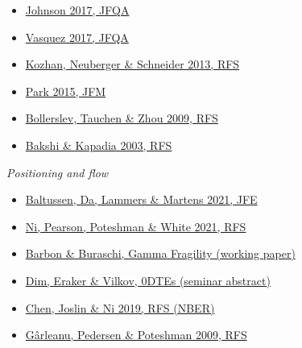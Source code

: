 \documentclass{article}
\begin{document}
\begin{itemize}

\item \href{https://ideas.repec.org/a/cup/jfinqa/v52y2017i06p2461-2490_00.html}{Johnson 2017, JFQA}

\item \href{https://ideas.repec.org/a/cup/jfinqa/v52y2017i06p2727-2754_00.html}{Vasquez 2017, JFQA}

\item \href{https://ideas.repec.org/a/oup/rfinst/v26y2013i9p2174-2203.html}{Kozhan, Neuberger \& Schneider 2013, RFS}

\item \href{https://econpapers.repec.org/RePEc:eee:finmar:v:26:y:2015:i:c:p:38-63}{Park 2015, JFM}

\item \href{https://econpapers.repec.org/RePEc:oup:rfinst:v:22:y:2009:i:11:p:4463-4492}{Bollerslev, Tauchen \& Zhou 2009, RFS}

\item \href{https://ideas.repec.org/a/oup/rfinst/v16y2003i2p527-566.html}{Bakshi \& Kapadia 2003, RFS}

\end{itemize}

\emph{Positioning and flow}

\begin{itemize}

\item \href{https://econpapers.repec.org/RePEc:eee:jfinec:v:142:y:2021:i:1:p:377-403}{Baltussen, Da, Lammers \& Martens 2021, JFE}

\item \href{https://ideas.repec.org/a/oup/rfinst/v34y2021i4p1952-1986..html}{Ni, Pearson, Poteshman \& White 2021, RFS}

\item \href{https://www.alexandria.unisg.ch/261487}{Barbon \& Buraschi, Gamma Fragility (working paper)}

\item \href{https://www.maths.ox.ac.uk/node/67396}{Dim, Eraker \& Vilkov, 0DTEs (seminar abstract)}

\item \href{https://www.nber.org/papers/w25573}{Chen, Joslin \& Ni 2019, RFS (NBER)}

\item \href{https://ideas.repec.org/a/oup/rfinst/v22y2009i10p4259-4299.html}{Gârleanu, Pedersen \& Poteshman 2009, RFS}

\end{itemize}
\end{document}
